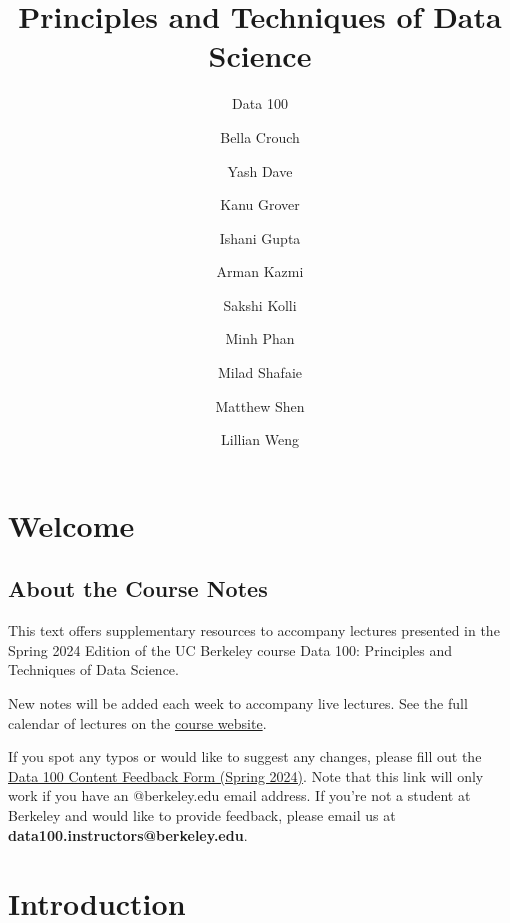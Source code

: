 \documentclass[
  letterpaper,
  DIV=11,
  numbers=noendperiod]{scrreprt}
\title{Principles and Techniques of Data Science}
\subtitle{Data 100}
\author{Bella Crouch \and Yash Dave \and Kanu Grover \and Ishani
Gupta \and Arman Kazmi \and Sakshi Kolli \and Minh Phan \and Milad
Shafaie \and Matthew Shen \and Lillian Weng}
\date{}
\renewcommand*\contentsname{Table of contents}
\newcommand\contentsname{Table of contents}
\begin{document}
\maketitle
\ifdefined\Shaded\renewenvironment{Shaded}{\begin{tcolorbox}[frame hidden, breakable, interior hidden, boxrule=0pt, sharp corners, borderline west={3pt}{0pt}{shadecolor}, enhanced]}{\end{tcolorbox}}\fi

\renewcommand*\contentsname{Table of contents}
{
\hypersetup{linkcolor=}
\setcounter{tocdepth}{2}
\tableofcontents
}

\hypertarget{welcome}{%
\chapter*{Welcome}\label{welcome}}


\hypertarget{about-the-course-notes}{%
\section*{About the Course Notes}\label{about-the-course-notes}}


This text offers supplementary resources to accompany lectures presented
in the Spring 2024 Edition of the UC Berkeley course Data 100:
Principles and Techniques of Data Science.

New notes will be added each week to accompany live lectures. See the
full calendar of lectures on the \href{https://ds100.org/sp24/}{course
website}.

If you spot any typos or would like to suggest any changes, please fill
out the \href{https://forms.gle/UL4xMNZVmjTbBLea9}{Data 100 Content
Feedback Form (Spring 2024)}. Note that this link will only work if you
have an @berkeley.edu email address. If you're not a student at Berkeley
and would like to provide feedback, please email us at
\textbf{data100.instructors@berkeley.edu}.


\hypertarget{introduction}{%
\chapter{Introduction}\label{introduction}}
\end{document}
